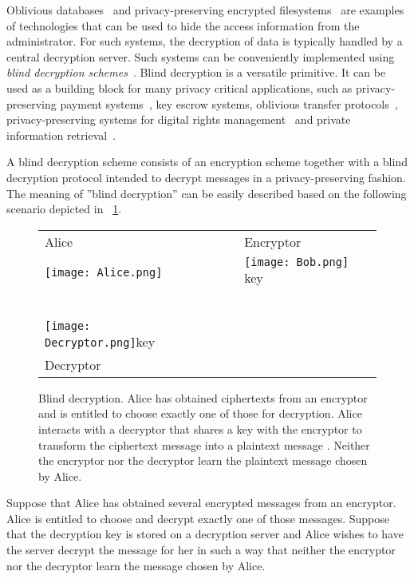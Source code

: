 \documentclass[10pt,journal]{IEEEtran}
\begin{document}
Oblivious databases~\cite{Coull_2009} and privacy-preserving encrypted filesystems~\cite{Green_2011}
are examples of technologies that can be used 
to hide the access information from the administrator.
For such systems, the decryption of data is typically handled by a central decryption server.
Such systems can be conveniently implemented using \emph{blind decryption schemes}~\cite{Sakurai_1996}.
Blind decryption is a versatile primitive.
It can be used as a building block for many privacy critical applications,
such as privacy-preserving
payment systems~\cite{Chaum_1983}, key escrow systems, oblivious transfer protocols~\cite{Green_2007},
privacy-preserving systems for digital rights management~\cite{Perlman_2010,Lei_2012}
and private information retrieval~\cite{Schnorr_2000}.

A blind decryption scheme consists of an encryption scheme together with a blind decryption protocol
intended to decrypt messages in a privacy-preserving fashion.
The meaning of ''blind decryption'' can be easily described based on the following scenario depicted in \figurename~\ref{fig:blind_decryption_basic}.
\begin{figure}[!t]
\centering
\begin{tabular}{m{3.1cm}m{1.3cm}m{0.5cm}m{2.1cm}}
Alice & & & Encryptor\\
\texttt{[image: Alice.png]}~ &  &  & \texttt{[image: Bob.png]} key \\
~~~~~ \\
\\
\texttt{[image: Decryptor.png]}key \\
Decryptor
\end{tabular}
\caption{Blind decryption. Alice has obtained  ciphertexts from an encryptor and is entitled to choose exactly one of those for decryption. Alice interacts with a decryptor that shares a key 
with the encryptor to transform
the ciphertext message  into a plaintext message . Neither the encryptor nor the decryptor learn the plaintext message chosen by Alice.}
\label{fig:blind_decryption_basic}
\end{figure}
Suppose that Alice has obtained several encrypted messages from an encryptor. Alice is entitled to choose and decrypt exactly one of those messages.
Suppose that the decryption key  is stored on a decryption server and Alice wishes to have the server decrypt the message for her
in such a way that neither the encryptor nor the decryptor learn the message chosen by Alice.
\end{document}
